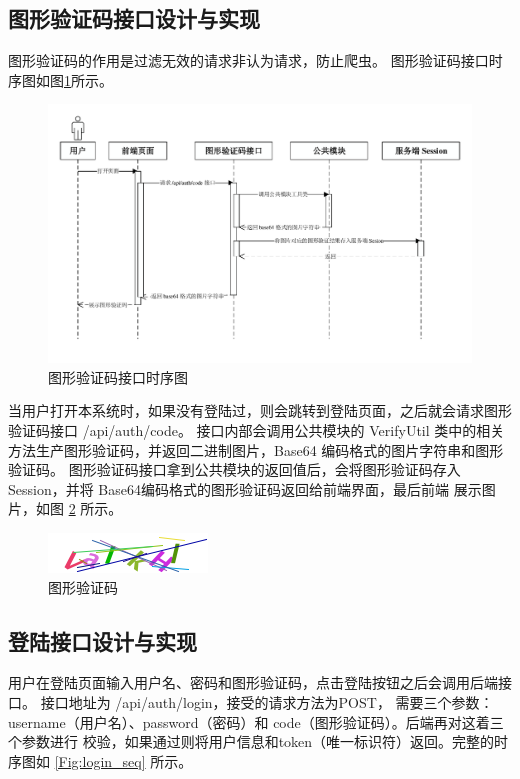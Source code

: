 \subsection{图形验证码接口设计与实现}
图形验证码的作用是过滤无效的请求非认为请求，防止爬虫。
图形验证码接口时序图如图\ref{Fig:code_seq}所示。

\begin{figure}[ht]
    \centering
    \includegraphics[width=0.9\linewidth]{./Figure/IMG_code_seq.pdf}
    \caption{图形验证码接口时序图}\label{Fig:code_seq}
\end{figure}

当用户打开本系统时，如果没有登陆过，则会跳转到登陆页面，之后就会请求图形验证码接口 /api/auth/code。
接口内部会调用公共模块的 VerifyUtil 类中的相关方法生产图形验证码，并返回二进制图片，Base64 编码格式的图片字符串和图形验证码。
图形验证码接口拿到公共模块的返回值后，会将图形验证码存入Session，并将 Base64编码格式的图形验证码返回给前端界面，最后前端
展示图片，如图 \ref{Fig:code_eg} 所示。

\begin{figure}[ht]
    \centering
    \includegraphics[width=0.5\linewidth]{./Figure/IMG_code.png}
    \caption{图形验证码}\label{Fig:code_eg}
\end{figure}

\subsection{登陆接口设计与实现}
用户在登陆页面输入用户名、密码和图形验证码，点击登陆按钮之后会调用后端接口。
接口地址为 /api/auth/login，接受的请求方法为POST，
需要三个参数：username（用户名）、password（密码）和 code（图形验证码）。后端再对这着三个参数进行
校验，如果通过则将用户信息和token（唯一标识符）返回。完整的时序图如 \ref{Fig:login_seq} 所示。

